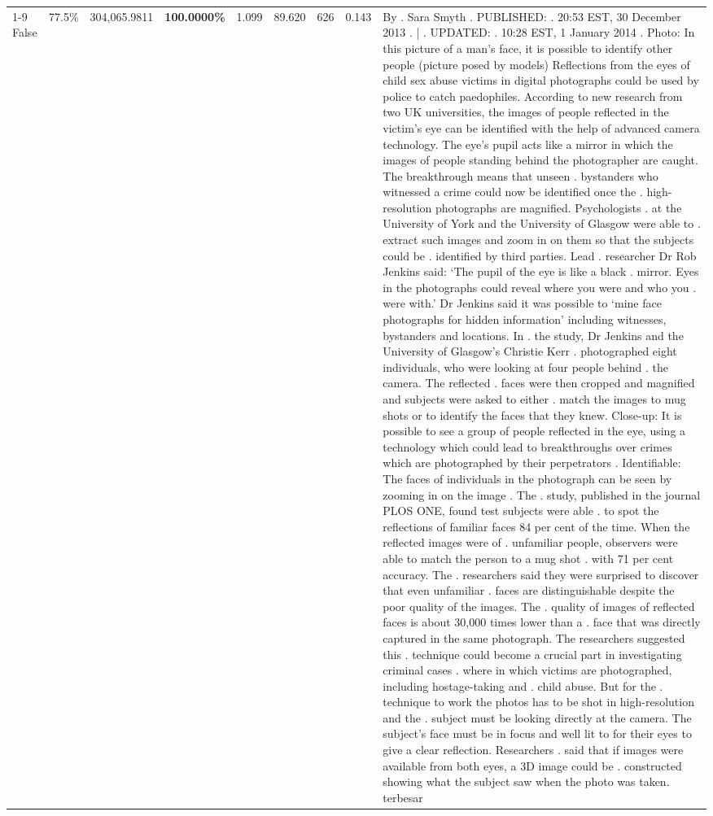 \begin{table}[H]
\begin{tabular}{lllrlllll}
\cline{1-9} \cline{2-9}
False & 77.5\% & 304,065.9811 & \bfseries \color{red} 100.0000\% & 1.099 & 89.620 & 626 & 0.143 & By . Sara Smyth . PUBLISHED: . 20:53 EST, 30 December 2013 . | . UPDATED: . 10:28 EST, 1 January 2014 . Photo: In this picture of a man's face, it is possible to identify other people (picture posed by models) Reflections from the eyes of child sex abuse victims in digital photographs could be used by police to catch paedophiles. According to new research from two UK universities, the images of people reflected in the victim's eye can be identified with the help of advanced camera technology. The eye's pupil acts like a mirror in which the images of people standing behind the photographer are caught. The breakthrough means that unseen . bystanders who witnessed a crime could now be identified once the . high-resolution photographs are magnified. Psychologists . at the University of York and the University of Glasgow were able to . extract such images and zoom in on them so that the subjects could be . identified by third parties. Lead . researcher Dr Rob Jenkins said: ‘The pupil of the eye is like a black . mirror. Eyes in the photographs could reveal where you were and who you . were with.' Dr Jenkins said it was possible to ‘mine face photographs for hidden information' including witnesses, bystanders and locations. In . the study, Dr Jenkins and the University of Glasgow's Christie Kerr . photographed eight individuals, who were looking at four people behind . the camera. The reflected . faces were then cropped and magnified and subjects were asked to either . match the images to mug shots or to identify the faces that they knew. Close-up: It is possible to see a group of people reflected in the eye, using a technology which could lead to breakthroughs over crimes which are photographed by their perpetrators . Identifiable: The faces of individuals in the photograph can be seen by zooming in on the image . The . study, published in the journal PLOS ONE, found test subjects were able . to spot the reflections of familiar faces 84 per cent of the time. When the reflected images were of . unfamiliar people, observers were able to match the person to a mug shot . with 71 per cent accuracy. The . researchers said they were surprised to discover that even unfamiliar . faces are distinguishable despite the poor quality of the images. The . quality of images of reflected faces is about 30,000 times lower than a . face that was directly captured in the same photograph. The researchers suggested this . technique could become a crucial part in investigating criminal cases . where in which victims are photographed, including hostage-taking and . child abuse. But for the . technique to work the photos has to be shot in high-resolution and the . subject must be looking directly at the camera. The subject's face must be in focus and well lit to for their eyes to give a clear reflection. Researchers . said that if images were available from both eyes, a 3D image could be . constructed showing what the subject saw when the photo was taken. terbesar \\

\end{tabular}
\end{table}
